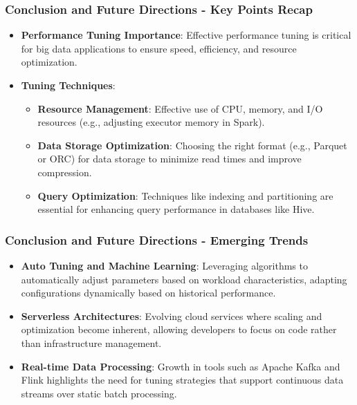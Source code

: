 \documentclass[aspectratio=169]{beamer}
\begin{document}
\begin{frame}[fragile]
    \frametitle{Conclusion and Future Directions - Key Points Recap}
    \begin{itemize}
        \item \textbf{Performance Tuning Importance}: Effective performance tuning is critical for big data applications to ensure speed, efficiency, and resource optimization.
        
        \item \textbf{Tuning Techniques}:
        \begin{itemize}
            \item \textbf{Resource Management}: Effective use of CPU, memory, and I/O resources (e.g., adjusting executor memory in Spark).
            \item \textbf{Data Storage Optimization}: Choosing the right format (e.g., Parquet or ORC) for data storage to minimize read times and improve compression.
            \item \textbf{Query Optimization}: Techniques like indexing and partitioning are essential for enhancing query performance in databases like Hive.
        \end{itemize}
    \end{itemize}
\end{frame}

\begin{frame}[fragile]
    \frametitle{Conclusion and Future Directions - Emerging Trends}
    \begin{itemize}
        \item \textbf{Auto Tuning and Machine Learning}: Leveraging algorithms to automatically adjust parameters based on workload characteristics, adapting configurations dynamically based on historical performance.
        
        \item \textbf{Serverless Architectures}: Evolving cloud services where scaling and optimization become inherent, allowing developers to focus on code rather than infrastructure management.
        
        \item \textbf{Real-time Data Processing}: Growth in tools such as Apache Kafka and Flink highlights the need for tuning strategies that support continuous data streams over static batch processing.
    \end{itemize}
\end{frame}
\end{document}
